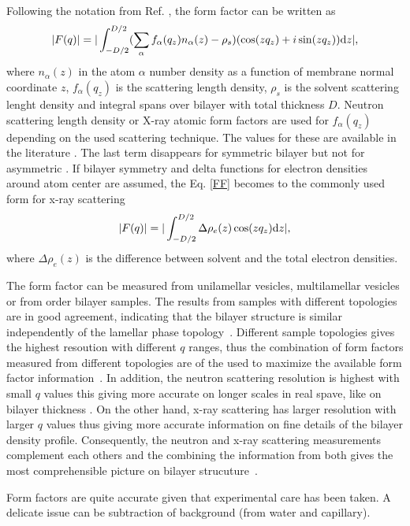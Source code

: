 \documentclass[aps,prl,superscriptaddress,twocolumn]{revtex4}
\begin{document}
Following the notation from Ref. \cite{kucerka10}, the form factor can be written as 
\begin{equation}\label{FF}
|F(q)|=|\int_{-D/2}^{D/2}(\sum_\alpha f_\alpha(q_z)n_\alpha(z) - \rho_s)(\cos(zq_z) + i \sin(zq_z)) {\rm d}z|,
\end{equation}
where $n_\alpha(z)$ in the atom $\alpha$ number density as a function of membrane normal coordinate $z$,
$f_\alpha(q_z)$ is the scattering length density, $\rho_s$ is the solvent scattering lenght density
and integral spans over bilayer with total thickness $D$.
Neutron scattering length density or X-ray atomic form factors are used for $f_\alpha(q_z)$ depending
on the used scattering technique. The values for these are available in the literature \cite{??}.
The last term disappears for symmetric bilayer but not for asymmetric \cite{??}.
If bilayer symmetry and delta functions for electron densities around atom center are assumed, the Eq. \ref{FF}
becomes to the commonly used form for x-ray scattering
\begin{equation}\label{FFsimpl}
|F(q)|=|\int_{-D/2}^{D/2}\Delta \rho_e(z) \cos(zq_z) {\rm d}z|,
\end{equation}
where $\Delta \rho_e(z)$ is the difference between solvent and the total electron densities.

The form factor can be measured from unilamellar vesicles, multilamellar vesicles or from order bilayer samples. 
The results from samples with different topologies are in good agreement, indicating that the bilayer
structure is similar independently of the lamellar phase topology~\cite{kucerka05,kucerka07}.
Different sample topologies gives the highest resoution with different $q$ ranges,
thus the combination of form factors measured from different topologies are of the used
to maximize the available form factor information~\cite{kucerka05}. In addition, the neutron scattering
resolution is highest with small $q$ values this giving more accurate on longer scales in real spave, like 
on bilayer thickness \cite{??}. On the other hand, x-ray scattering has larger resolution with larger $q$ values
thus giving more accurate information on fine details of the bilayer density profile. Consequently,
the neutron and x-ray scattering measurements complement each others and the combining the information
from both gives the most comprehensible picture on bilayer strucuture~\cite{kucerka08a}.

Form factors are quite accurate given that experimental care has been taken. A delicate issue 
can be subtraction of background (from water and capillary).  \\
\end{document}

